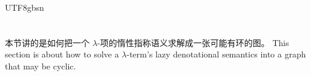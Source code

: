 \begin{CJK*}{UTF8}{gbsn}
  \section{}\label{sec:bridge}
  \ifPaperChinese
  本节讲的是如何把一个 $\lambda$-项的惰性指称语义求解成一张可能有环的图。
  \else
  This section is about how to solve a $\lambda$-term's lazy denotational semantics into a graph that may be cyclic.
  \fi


\end{CJK*}
